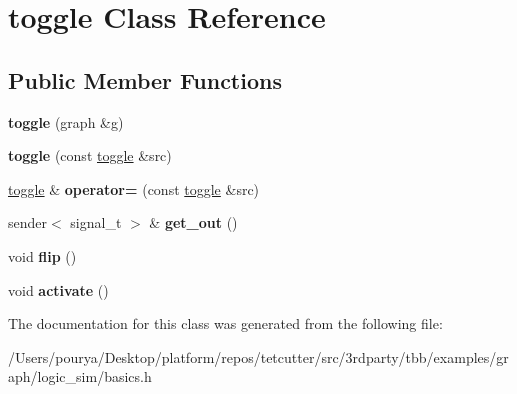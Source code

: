 \hypertarget{classtoggle}{}\section{toggle Class Reference}
\label{classtoggle}
\subsection*{Public Member Functions}
\begin{DoxyCompactItemize}
\item 
\hypertarget{classtoggle_a17fee15f9fd2995042c04df2f0c58c3c}{}{\bfseries toggle} (graph \&g)\label{classtoggle_a17fee15f9fd2995042c04df2f0c58c3c}

\item 
\hypertarget{classtoggle_acec9e3f4f9e9a2c03f02d605ca155e3a}{}{\bfseries toggle} (const \hyperlink{classtoggle}{toggle} \&src)\label{classtoggle_acec9e3f4f9e9a2c03f02d605ca155e3a}

\item 
\hypertarget{classtoggle_a711caef6de625ed646aa2db96b7413ee}{}\hyperlink{classtoggle}{toggle} \& {\bfseries operator=} (const \hyperlink{classtoggle}{toggle} \&src)\label{classtoggle_a711caef6de625ed646aa2db96b7413ee}

\item 
\hypertarget{classtoggle_a0dcf530d972cb83394989e6f0c33e6cd}{}sender$<$ signal\+\_\+t $>$ \& {\bfseries get\+\_\+out} ()\label{classtoggle_a0dcf530d972cb83394989e6f0c33e6cd}

\item 
\hypertarget{classtoggle_a25724ad93a6b61613800fe892853014a}{}void {\bfseries flip} ()\label{classtoggle_a25724ad93a6b61613800fe892853014a}

\item 
\hypertarget{classtoggle_ae8da1dbf2b6a5ee89e37206d0d6a3cfe}{}void {\bfseries activate} ()\label{classtoggle_ae8da1dbf2b6a5ee89e37206d0d6a3cfe}

\end{DoxyCompactItemize}


The documentation for this class was generated from the following file\+:\begin{DoxyCompactItemize}
\item 
/\+Users/pourya/\+Desktop/platform/repos/tetcutter/src/3rdparty/tbb/examples/graph/logic\+\_\+sim/basics.\+h\end{DoxyCompactItemize}
